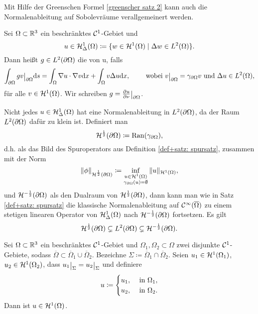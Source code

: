 Mit Hilfe der Greenschen Formel \eqref{greenscher satz 2} kann auch die Normalenableitung auf Sobolevräume verallgemeinert werden.
\begin{definition}
	Sei \(\Omega\subset\mathbb{R}^3\) ein beschränktes \(\mathcal{C}^1\)-Gebiet und 
	\begin{equation*}
		u\in\mathcal{H}_\Delta^1(\Omega)\coloneqq\{w\in\mathcal{H}^1(\Omega)\mid\Delta w\in L^2(\Omega)\}.
	\end{equation*}
	Dann heißt \(g\in L^2(\partial\Omega)\) die  von u, falls
	\begin{equation*}
		\int_{\p\Omega}gv\restrict{\p\Omega}\ds = \int_\Omega\nabla u\cdot\nabla v\dx + \int_\Omega v\Delta u\dx,\qquad\te{ wobei }v\restrict{\p\Omega}=\gamma_{\p\Omega}v\te{ und }\Delta u\in L^2(\Omega),
	\end{equation*}
	für alle \(v\in\mathcal{H}^1(\Omega)\). Wir schreiben \(g=\frac{\p u}{\p\normal}\restrict{\p\Omega}\).
\end{definition}
\begin{counter bem}
	 Nicht jedes \(u\in\mathcal{H}_\Delta^1(\Omega)\) hat eine Normalenableitung in \(L^2(\partial\Omega)\), da der Raum \(L^2(\partial\Omega)\) dafür \glqq{}zu klein\grqq{} ist. Definiert man
	 \begin{equation*}
	 	\mathcal{H}^\frac{1}{2}(\partial\Omega)\coloneqq\operatorname{Ran}(\gamma_{\partial\Omega}),
	 \end{equation*}
 	d.h. als das Bild des Spuroperators aus Definition \ref{def+satz: spursatz}, zusammen mit der Norm
 	\begin{equation*}
 		\|\phi\|_{\mathcal{H}^\frac{1}{2}(\partial\Omega)}\coloneqq\inf_{\substack{u\in\mathcal{H}^1(\Omega)\\\gamma_{\partial\Omega}(u)=\emptyset}}\|u\|_{\mathcal{H}^1(\Omega)},
 	\end{equation*}
 	und \(\mathcal{H}^{-\frac{1}{2}}(\partial\Omega)\) als den Dualraum von \(\mathcal{H}^{\frac{1}{2}}(\partial\Omega)\), dann kann man wie in Satz \ref{def+satz: spursatz} die klassische Normalenableitung auf \(\mathcal{C}^\infty(\overline{\Omega})\) zu einem stetigen linearen Operator von \(\mathcal{H}_\Delta^1(\Omega)\) nach \(\mathcal{H}^{-\frac{1}{2}}(\partial\Omega)\) fortsetzen. Es gilt
 	\begin{equation*}
 		\mathcal{H}^{\frac{1}{2}}(\partial\Omega)\subsetneq L^2(\partial\Omega)\subsetneq \mathcal{H}^{-\frac{1}{2}}(\partial\Omega).
 	\end{equation*}
\end{counter bem}
\begin{lem}\label{lem: fortsetzung von zwei gebieten auf ein gebiet}
	Sei \(\Omega\subset\mathbb{R}^3\) ein beschränktes \(\mathcal{C}^1\)-Gebiet und \(\Omega_1,\Omega_2\subset\Omega\) zwei disjunkte \(\mathcal{C}^1\)-Gebiete, sodass \(\overline{\Omega}\subset\overline{\Omega}_1\cup\overline{\Omega}_2\). Bezeichne \(\Sigma\coloneqq\overline{\Omega}_1\cap\overline{\Omega}_2\). Seien \(u_1\in\mathcal{H}^1(\Omega_1)\), \(u_2\in\mathcal{H}^1(\Omega_2)\), dass \(u_1\restrict{\Sigma}=u_2\restrict{\Sigma}\) und definiere
	\begin{equation*}
		u\coloneqq
		\begin{cases}
			u_1,&\text{ in }\Omega_1,\\
			u_2,&\text{ in }\Omega_2.
		\end{cases}
	\end{equation*}
	Dann ist \(u\in\mathcal{H}^1(\Omega)\).
\end{lem}
